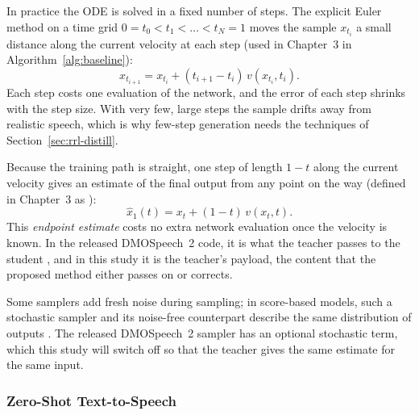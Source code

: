 In practice the ODE is solved in a fixed number of steps. The explicit Euler method \parencite{hairer1993} on a time grid $0=t_0<t_1<\dots<t_N=1$ moves the sample $x_{t_i}$ a small distance along the current velocity at each step (used in Chapter~3 in Algorithm~\ref{alg:baseline}):
\begin{equation}
x_{t_{i+1}} = x_{t_i} + (t_{i+1}-t_i)\, v(x_{t_i}, t_i).
\label{eq:rrl-euler}
\end{equation}
Each step costs one evaluation of the network, and the error of each step shrinks with the step size. With very few, large steps the sample drifts away from realistic speech, which is why few-step generation needs the techniques of Section~\ref{sec:rrl-distill}.

Because the training path is straight, one step of length $1-t$ along the current velocity gives an estimate of the final output from any point on the way \parencite{li2025dmospeech2,lipman2024guide} (defined in Chapter~3 as ):
\begin{equation}
\hat{x}_1(t) = x_t + (1-t)\, v(x_t,t).
\label{eq:rrl-endpoint}
\end{equation}
This \emph{endpoint estimate} costs no extra network evaluation once the velocity is known. In the released DMOSpeech~2 code, it is what the teacher passes to the student \parencite[see also Section~\ref{sec:rrl-handover}]{li2025dmospeech2code}, and in this study it is the teacher's payload, the content that the proposed method either passes on or corrects.

Some samplers add fresh noise during sampling; in score-based models, such a stochastic sampler and its noise-free counterpart describe the same distribution of outputs \parencite{song2021sde}. The released DMOSpeech~2 sampler has an optional stochastic term, which this study will switch off so that the teacher gives the same estimate for the same input.

\subsubsection{Zero-Shot Text-to-Speech}

